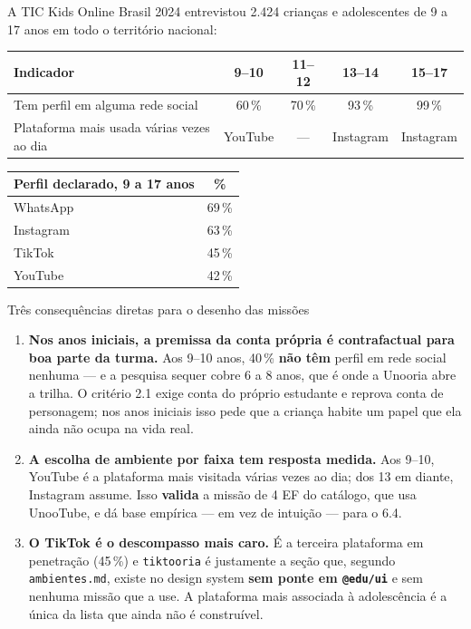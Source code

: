 \documentclass[11pt,a4paper]{article}
\begin{document}
A TIC Kids Online Brasil 2024 \cite{tickids2024} entrevistou 2.424 crian\c{c}as e adolescentes de
9 a 17 anos em todo o territ\'orio nacional:

\begin{center}
\begin{tabular}{@{}l c c c c@{}}
\toprule
\textbf{Indicador} & \textbf{9--10} & \textbf{11--12} & \textbf{13--14} & \textbf{15--17} \\
\midrule
Tem perfil em alguma rede social & 60\,\% & 70\,\% & 93\,\% & 99\,\% \\
Plataforma mais usada v\'arias vezes ao dia & YouTube & --- & Instagram & Instagram \\
\bottomrule
\end{tabular}
\end{center}

\begin{center}
\begin{tabular}{@{}l c@{}}
\toprule
\textbf{Perfil declarado, 9 a 17 anos} & \textbf{\%} \\
\midrule
WhatsApp & 69\,\% \\
Instagram & 63\,\% \\
TikTok & 45\,\% \\
YouTube & 42\,\% \\
\bottomrule
\end{tabular}
\end{center}

\begin{notabox}{Tr\^es consequ\^encias diretas para o desenho das miss\~oes}
\begin{enumerate}
  \item \textbf{Nos anos iniciais, a premissa da conta pr\'opria \'e contrafactual para boa parte
        da turma.} Aos 9--10 anos, 40\,\% \textbf{n\~ao t\^em} perfil em rede social nenhuma --- e
        a pesquisa sequer cobre 6 a 8 anos, que \'e onde a Unooria abre a trilha. O crit\'erio 2.1
        exige conta do pr\'oprio estudante e reprova conta de personagem; nos anos iniciais isso
        pede que a crian\c{c}a habite um papel que ela ainda n\~ao ocupa na vida real.
  \item \textbf{A escolha de ambiente por faixa tem resposta medida.} Aos 9--10, YouTube \'e a
        plataforma mais visitada v\'arias vezes ao dia; dos 13 em diante, Instagram assume. Isso
        \textbf{valida} a miss\~ao de 4\textordmasculine{} EF do cat\'alogo, que usa UnooTube, e d\'a
        base emp\'irica --- em vez de intui\c{c}\~ao --- para o 6.4.
  \item \textbf{O TikTok \'e o descompasso mais caro.} \'E a terceira plataforma em penetra\c{c}\~ao
        (45\,\%) e \texttt{tiktooria} \'e justamente a se\c{c}\~ao que, segundo
        \texttt{ambientes.md}, existe no design system \textbf{sem ponte em \texttt{@edu/ui}} e sem
        nenhuma miss\~ao que a use. A plataforma mais associada \`a adolesc\^encia \'e a \'unica da
        lista que ainda n\~ao \'e constru\'ivel.
\end{enumerate}
\end{notabox}
\end{document}
